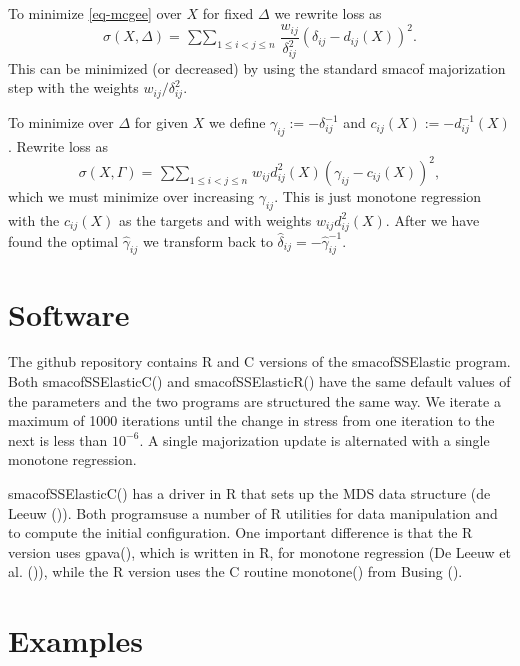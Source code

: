 \documentclass[
  12pt,
  letterpaper,
  DIV=11,
  numbers=noendperiod]{scrartcl}
\begin{document}
To minimize \eqref{eq-mcgee} over \(X\) for fixed \(\Delta\) we rewrite
loss as \begin{equation}
  \sigma(X,\Delta) = \mathop{\sum\sum}_{1 \leq i<j \leq n}\frac{w_{ij}}{\delta_{ij}^2}(\delta_{ij} - d_{ij}(X))^2.\label{eq-mcgee4}
\end{equation} This can be minimized (or decreased) by using the
standard smacof majorization step with the weights
\(w_{ij}/\delta_{ij}^2\).

To minimize over \(\Delta\) for given \(X\) we define
\(\gamma_{ij} := -\delta_{ij}^{-1}\) and
\(c_{ij}(X) := -d_{ij}^{-1}(X)\). Rewrite loss as \begin{equation}
  \sigma(X,\Gamma) = \mathop{\sum\sum}_{1 \leq i<j \leq n}w_{ij}d_{ij}^2(X)(\gamma_{ij} - c_{ij}(X))^2,\label{eq-mcgee5}
\end{equation} which we must minimize over increasing \(\gamma_{ij}\).
This is just monotone regression with the \(c_{ij}(X)\) as the targets
and with weights \(w_{ij}d_{ij}^2(X)\). After we have found the optimal
\(\hat\gamma_{ij}\) we transform back to
\(\hat\delta_{ij} = -\hat\gamma_{ij}^{-1}\).

\section{Software}\label{software}

The github repository contains R and C versions of the smacofSSElastic
program. Both smacofSSElasticC() and smacofSSElasticR() have the same
default values of the parameters and the two programs are structured the
same way. We iterate a maximum of 1000 iterations until the change in
stress from one iteration to the next is less than \ensuremath{10^{-6}}.
A single majorization update is alternated with a single monotone
regression.

smacofSSElasticC() has a driver in R that sets up the MDS data structure
({de Leeuw} ()). Both programsuse a
number of R utilities for data manipulation and to compute the initial
configuration. One important difference is that the R version uses
gpava(), which is written in R, for monotone regression (De Leeuw et al.
()), while the R version
uses the C routine monotone() from Busing
().

\section{Examples}\label{examples}
\end{document}
